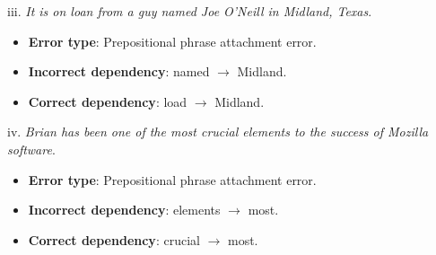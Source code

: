\documentclass[12pt]{article}
\begin{document}
iii. \textit{It is on loan from a guy named Joe O'Neill in Midland, Texas}.
\begin{itemize}
\item \textbf{Error type}: Prepositional phrase attachment error.
\item \textbf{Incorrect dependency}: named $\to$ Midland.
\item \textbf{Correct dependency}: load $\to$ Midland.
\end{itemize}

iv. \textit{Brian has been one of the most crucial elements to the success of Mozilla software}.
\begin{itemize}
\item \textbf{Error type}: Prepositional phrase attachment error.
\item \textbf{Incorrect dependency}: elements $\to$ most.
\item \textbf{Correct dependency}: crucial $\to$ most.
\end{itemize}
\end{document}

